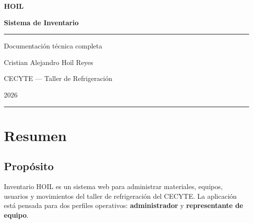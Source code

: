 \documentclass[12pt,a4paper,oneside]{report}
\begin{document}
\thispagestyle{empty}
\begin{center}

\vspace*{4cm}

{\fontsize{48}{52}\selectfont\bfseries\color{cecyteGreen}HOIL}

\vspace{8pt}

{\Large\bfseries\color{cecyteDark}Sistema de Inventario}

\vspace{16pt}

\textcolor{cecyteGreen}{\rule{6cm}{1.2pt}}

\vspace{16pt}

{\large\color{gray}Documentación técnica completa}

\vspace{32pt}

{\normalsize
Cristian Alejandro Hoil Reyes

\vspace{8pt}

CECYTE --- Taller de Refrigeración

\vspace{8pt}

2026
}

\vfill

\textcolor{cecyteGreen!30}{\rule{\textwidth}{6pt}}

\end{center}

\clearpage

\pagestyle{empty}
\tableofcontents
\clearpage
\pagestyle{fancy}

\chapter{Resumen}

\section{Propósito}

Inventario HOIL es un sistema web para administrar materiales, equipos, usuarios y movimientos del taller de refrigeración del CECYTE. La aplicación está pensada para dos perfiles operativos: \textbf{administrador} y \textbf{representante de equipo}.
\end{document}
